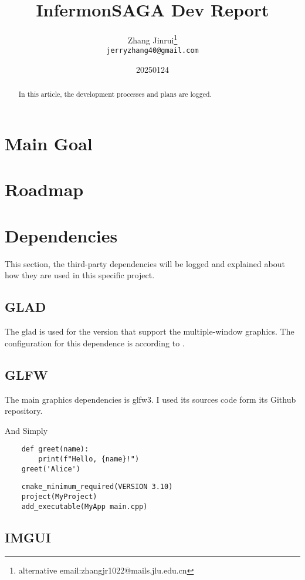 \documentclass{article}
\title{InfermonSAGA Dev Report}
\author{Zhang Jinrui\thanks{alternative email:zhangjr1022@mails.jlu.edu.cn} \\ \texttt{jerryzhang40@gmail.com}}
\date{20250124}  %
\theoremstyle{definition} %
\begin{document}
\maketitle

\begin{abstract}
    In this article, the development processes
    and plans are logged.
\end{abstract}

\section{Main Goal}
\section{Roadmap}
\section[deps]{Dependencies}
This section, the third-party dependencies
will be logged and explained about how they
are used in this specific project.
\subsection[GLAD]{GLAD}
The glad is used for the version that support
the multiple-window graphics. The configuration
for this dependence is according to
\cite[gladMultiwinMx]{GLAD_multiwin_mx}.
\subsection[GLFW]{GLFW}
The main graphics dependencies is glfw3.
I used its sources code form its Github
repository.

And Simply

\begin{verbatim}
    def greet(name):
        print(f"Hello, {name}!")
    greet('Alice')
\end{verbatim}

\begin{verbatim}
    cmake_minimum_required(VERSION 3.10)
    project(MyProject)
    add_executable(MyApp main.cpp)
\end{verbatim}

\subsection[IMGUI]{IMGUI}
\end{document}
